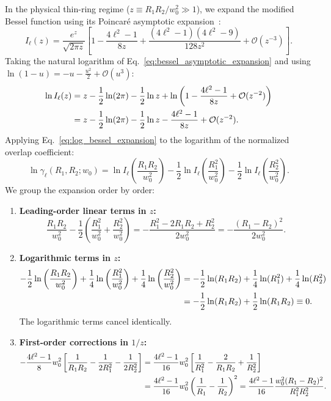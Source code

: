 \documentclass[11pt,a4paper]{article}
\begin{document}
In the physical thin-ring regime ($z \equiv R_1 R_2 / w_0^2 \gg 1$), we expand the modified Bessel function using its Poincaré asymptotic expansion~\cite{Gradshteyn2014}:
\begin{equation}
I_\ell(z) = \frac{e^z}{\sqrt{2\pi z}} \left[ 1 - \frac{4\ell^2 - 1}{8z} + \frac{(4\ell^2 - 1)(4\ell^2 - 9)}{128 z^2} + \mathcal{O}(z^{-3}) \right].
\label{eq:bessel_asymptotic_expansion}
\end{equation}
Taking the natural logarithm of Eq.~\eqref{eq:bessel_asymptotic_expansion} and using $\ln(1 - u) = -u - \frac{u^2}{2} + \mathcal{O}(u^3)$:
\begin{align}
\ln I_\ell(z) &= z - \frac{1}{2}\ln(2\pi) - \frac{1}{2}\ln z + \ln\left( 1 - \frac{4\ell^2 - 1}{8z} + \mathcal{O}(z^{-2}) \right) \notag \\
&= z - \frac{1}{2}\ln(2\pi) - \frac{1}{2}\ln z - \frac{4\ell^2 - 1}{8z} + \mathcal{O}(z^{-2}).
\label{eq:log_bessel_expansion}
\end{align}
Applying Eq.~\eqref{eq:log_bessel_expansion} to the logarithm of the normalized overlap coefficient:
\begin{equation}
\ln \gamma_\ell(R_1, R_2; w_0) = \ln I_\ell\left( \frac{R_1 R_2}{w_0^2} \right) - \frac{1}{2} \ln I_\ell\left( \frac{R_1^2}{w_0^2} \right) - \frac{1}{2} \ln I_\ell\left( \frac{R_2^2}{w_0^2} \right).
\label{eq:log_gamma_expansion}
\end{equation}
We group the expansion order by order:
\begin{enumerate}
    \item \textbf{Leading-order linear terms in $z$:}
    \begin{equation}
    \frac{R_1 R_2}{w_0^2} - \frac{1}{2} \left( \frac{R_1^2}{w_0^2} + \frac{R_2^2}{w_0^2} \right) = - \frac{R_1^2 - 2 R_1 R_2 + R_2^2}{2 w_0^2} = - \frac{(R_1 - R_2)^2}{2 w_0^2}.
    \label{eq:linear_cancellation}
    \end{equation}
    \item \textbf{Logarithmic terms in $z$:}
    \begin{align}
    - \frac{1}{2} \ln\left( \frac{R_1 R_2}{w_0^2} \right) + \frac{1}{4} \ln\left( \frac{R_1^2}{w_0^2} \right) + \frac{1}{4} \ln\left( \frac{R_2^2}{w_0^2} \right) &= - \frac{1}{2} \ln(R_1 R_2) + \frac{1}{4} \ln(R_1^2) + \frac{1}{4} \ln(R_2^2) \notag \\
    &= - \frac{1}{2} \ln(R_1 R_2) + \frac{1}{2} \ln(R_1 R_2) \equiv 0.
    \label{eq:log_cancellation}
    \end{align}
    The logarithmic terms cancel identically.
    \item \textbf{First-order corrections in $1/z$:}
    \begin{align}
    - \frac{4\ell^2 - 1}{8} w_0^2 \left[ \frac{1}{R_1 R_2} - \frac{1}{2 R_1^2} - \frac{1}{2 R_2^2} \right] &= \frac{4\ell^2 - 1}{16} w_0^2 \left[ \frac{1}{R_1^2} - \frac{2}{R_1 R_2} + \frac{1}{R_2^2} \right] \notag \\
    &= \frac{4\ell^2 - 1}{16} w_0^2 \left( \frac{1}{R_1} - \frac{1}{R_2} \right)^2 = \frac{4\ell^2 - 1}{16} \frac{w_0^2 (R_1 - R_2)^2}{R_1^2 R_2^2}.
    \label{eq:correction_algebra}
    \end{align}
\end{enumerate}
\end{document}
